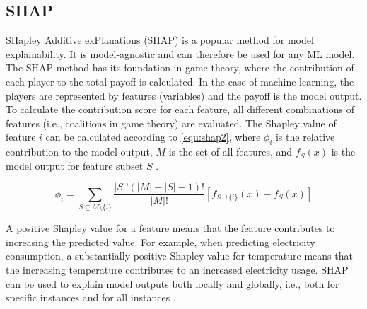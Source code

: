 \subsection{SHAP}

SHapley Additive exPlanations (SHAP) is a popular method for model explainability. It is model-agnostic and can therefore be used for any ML model. The SHAP method has its foundation in game theory, where the contribution of each player to the total payoff is calculated. In the case of machine learning, the players are represented by features (variables) and the payoff is the model output. To calculate the contribution score for each feature, all different combinations of features (i.e., coalitions in game theory) are evaluated. The Shapley value of feature $i$ can be calculated according to \autoref{equ:shap2}, where $\phi_i$ is the relative contribution to the model output, $M$ is the set of all features, and $f_S(x)$ is the model output for feature subset $S$ %
\cite{salih_perspective_2025,mitchell_gputreeshap_2022}.


\begin{equation}\label{equ:shap2}
    \phi_i = \sum_{S \subseteq M \setminus \{i\}}{} \frac{\left| S \right| ! (\left| M \right| - \left| S \right| - 1) !}{\left| M \right| !} [f_{S \cup \{i\}}(x) - f_S(x)]
\end{equation}

A positive Shapley value for a feature means that the feature contributes to increasing the predicted value. For example, when predicting electricity consumption, a substantially positive Shapley value for temperature means that the increasing temperature contributes to an increased electricity usage. SHAP can be used to explain model outputs both locally and globally, i.e., both for specific instances and for all instances \cite{moon_advancing_2024,salih_perspective_2025}.

